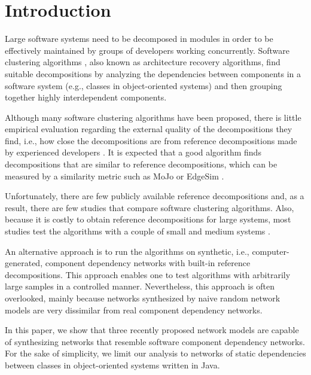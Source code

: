 \newcommand{\din}[0]{\ensuremath{\delta_{in}}}
\newcommand{\dout}[0]{\ensuremath{\delta_{out}}}


\section{Introduction} \label{sec:introduction}

Large software systems need to be decomposed in modules in order to be
effectively maintained by groups of developers working concurrently. Software
clustering algorithms \cite{Anquetil1999}, also known as architecture recovery
algorithms, find suitable decompositions by analyzing the dependencies between
components in a software system (e.g., classes in object-oriented systems) and
then grouping together highly interdependent components.

Although many software clustering algorithms have been proposed, there is
little empirical evaluation regarding the external quality of the
decompositions they find, i.e., how close the decompositions are from reference
decompositions made by experienced developers \cite{Anquetil1999}. It is
expected that a good algorithm finds decompositions that are similar to
reference decompositions, which can be measured by a similarity metric such as
MoJo or EdgeSim \cite{Mitchell2001}.

Unfortunately, there are few publicly available reference decompositions
\cite{Anquetil1999} and, as a result, there are few studies that compare
software clustering algorithms. Also, because it is costly to obtain reference
decompositions for large systems, most studies test the algorithms with a
couple of small and medium systems \cite{Anquetil1999,Bittencourt2009}.

An alternative approach is to run the algorithms on synthetic, i.e., computer-
generated, component dependency networks with built-in reference
decompositions. This approach enables one to test algorithms with arbitrarily
large samples in a controlled manner. Nevertheless, this approach is often
overlooked, mainly because networks synthesized by naive random network models
are very dissimilar from real component dependency networks.

In this paper, we show that three recently proposed network models are capable
of synthesizing networks that resemble software component dependency networks.
For the sake of simplicity, we limit our analysis to networks of static
dependencies between classes in object-oriented systems written in Java.

